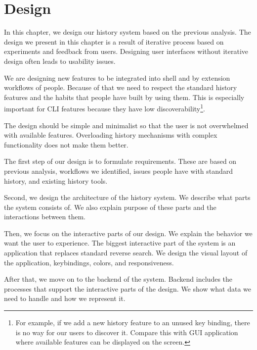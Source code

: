 
\chapter{Design}

In this chapter, we design our history system based on the previous analysis.
The design we present in this chapter is a result of iterative process based on experiments and feedback from users. Designing user interfaces without iterative design often leads to usability issues.\cite{nielsen1993iterative}
    
We are designing new features to be integrated into shell and by extension workflows of people. Because of that we need to respect the standard history features and the habits that people have built by using them. This is especially important for CLI features because they have low discoverability\footnote{For example, if we add a new history feature to an unused key binding, there is no way for our users to discover it. Compare this with GUI application where available features can be displayed on the screen.}.



The design should be simple and minimalist so that the user is not overwhelmed with available features. Overloading history mechanisms with complex functionality does not make them better.\cite{greenberg1993computer}


The first step of our design is to formulate requirements. These are based on previous analysis, workflows we identified, issues people have with standard history, and existing history tools. 

Second, we design the architecture of the history system. We describe what parts the system consists of. We also explain purpose of these parts and the interactions between them.

%
Then, we focus on the interactive parts of our design. We explain the behavior we want the user to experience. The biggest interactive part of the system is an application that replaces standard reverse search. We design the visual layout of the application, keybindings, colors, and responsiveness. 

After that, we move on to the backend of the system. Backend includes the processes that support the interactive parts of the design. We show what data we need to handle and how we represent it.

